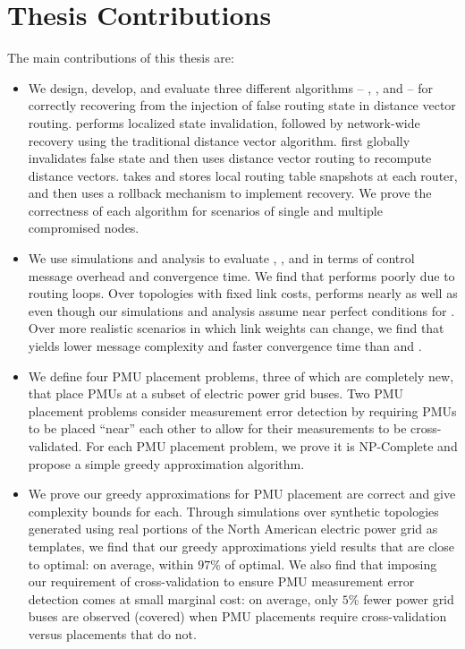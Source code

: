 \section{Thesis Contributions}


The main contributions of this thesis are:
\begin{itemize}

	\item  We design, develop, and evaluate three different algorithms -- \seconds, \purges, and \cpr -- for correctly recovering from the injection of false routing state in distance vector routing.
		\second performs localized state invalidation, followed by network-wide recovery using the traditional distance vector algorithm. 
		\purge first globally invalidates false state and then uses distance vector routing to recompute distance vectors.  \cpr takes and stores local routing table 
		snapshots at each router, and then uses 
		a rollback mechanism to implement recovery. We prove the correctness of each algorithm for scenarios of single and multiple compromised nodes.

	

	\item We use simulations and analysis to evaluate \seconds, \purges, and \cpr in terms of control message overhead and convergence time. We find that \second performs poorly due to routing loops.  
	Over topologies with fixed link costs, \purge performs nearly as well as \cpr even though our simulations and analysis assume near perfect conditions for \cprs.
	Over more realistic scenarios in which link weights can change, we find that \purge yields lower message complexity and faster convergence time than \cpr and \seconds. 


	\item We define four PMU placement problems, three of which are completely new, that place PMUs at a subset of electric power grid buses. 
		Two PMU placement problems consider measurement error detection by requiring PMUs to be placed ``near'' each other to allow for their measurements to be cross-validated. 
		For each PMU placement problem, we prove it is NP-Complete and propose a simple greedy approximation algorithm. 

	
	\item We prove our greedy approximations for PMU placement are correct and give complexity bounds for each.  Through simulations over synthetic topologies generated using real portions of the 
		North American electric power grid as templates, we find that our greedy approximations yield results that are close to optimal: on average, within $97\%$ of optimal.  We also find that 
		imposing our requirement of cross-validation to ensure PMU measurement error detection comes at small marginal cost: on average, only $5\%$ fewer power grid buses are observed (covered) 
		when PMU placements require cross-validation versus placements that do not. 
	


\end{itemize}
